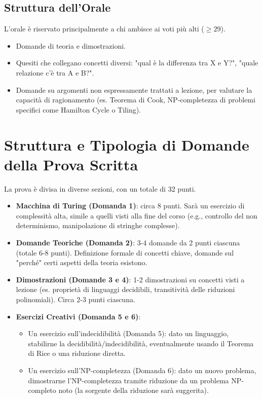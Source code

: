 \documentclass[a4paper, 11pt]{book} %
\theoremstyle{definition}
\begin{document}
\subsection{Struttura dell'Orale}
L'orale è riservato principalmente a chi ambisce ai voti più alti ($\geq 29$).
\begin{itemize}
    \item Domande di teoria e dimostrazioni.
    \item Quesiti che collegano concetti diversi: "qual è la differenza tra X e Y?", "quale relazione c'è tra A e B?".
    \item Domande su argomenti non espressamente trattati a lezione, per valutare la capacità di ragionamento (es. Teorema di Cook, NP-completezza di problemi specifici come Hamilton Cycle o Tiling).
\end{itemize}

\section{Struttura e Tipologia di Domande della Prova Scritta}
La prova è divisa in diverse sezioni, con un totale di 32 punti.
\begin{itemize}
    \item \textbf{Macchina di Turing (Domanda 1)}: circa 8 punti. Sarà un esercizio di complessità alta, simile a quelli visti alla fine del corso (e.g., controllo del non determinismo, manipolazione di stringhe complesse).
    \item \textbf{Domande Teoriche (Domanda 2)}: 3-4 domande da 2 punti ciascuna (totale 6-8 punti). Definizione formale di concetti chiave, domande sul "perché" certi aspetti della teoria esistono.
    \item \textbf{Dimostrazioni (Domande 3 e 4)}: 1-2 dimostrazioni su concetti visti a lezione (es. proprietà di linguaggi decidibili, transitività delle riduzioni polinomiali). Circa 2-3 punti ciascuna.
    \item \textbf{Esercizi Creativi (Domanda 5 e 6)}:
    \begin{itemize}
        \item Un esercizio sull'indecidibilità (Domanda 5): dato un linguaggio, stabilirne la decidibilità/indecidibilità, eventualmente usando il Teorema di Rice o una riduzione diretta.
        \item Un esercizio sull'NP-completezza (Domanda 6): dato un nuovo problema, dimostrarne l'NP-completezza tramite riduzione da un problema NP-completo noto (la sorgente della riduzione sarà suggerita).
    \end{itemize}
\end{itemize}
\end{document}

